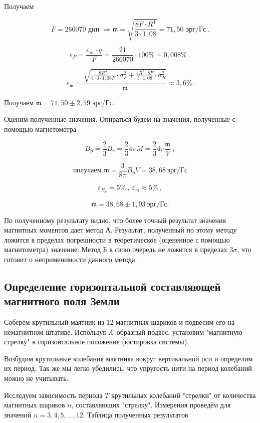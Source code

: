 \documentclass[a4paper, 12pt]{article}%
\begin{document}
Получаем 

\[F = 266070\text{ дин } \Rightarrow \mathfrak{m} = \sqrt{\frac{8F\cdot R^4}{3 \cdot 1,08}} =71,50 \text{ эрг/Гс} \ .\]

\[ \varepsilon_F = \frac{\varepsilon_m \cdot g}{F} = \frac{21}{266070} \cdot 100\% = 0,008\%\text{ ,}\]

\[ \varepsilon_{\mathfrak{m}} = \frac{\sqrt{\frac{8R^4}{4\cdot3\cdot1,08F}\cdot \sigma^2_{F} + \frac{4R^2\cdot 8F}{3\cdot 1,08}\cdot \sigma^2_{R}}}{\mathfrak{m}} \approx  3,6\%.\]

Получаем $\mathfrak{m} = 71,50 \pm 2,59$ эрг/Гс.

Оценим полученные значения. Опираться будем на значения, полученные с помощью магнетометра 

\[ B_p = \frac{2}{3} B_r = \frac{2}{3} 4\pi M = \frac{2}{3} 4\pi \frac{\mathfrak{m}}{V}\ , \]

\[ \text{получаем } \mathfrak{m} = \frac{3}{8\pi} B_p V = 38,68\ \text{эрг/Гс}\]

\[ \varepsilon_{B_p} = 5 \%\ ,\ \varepsilon_{\mathfrak{m}} \approx 5\% \ ,\]

\[ \mathfrak{m} = 38,68 \pm 1,93\ \text{эрг/Гс}.\]

По полученному результату видно, что более точный результат значения магнитных моментов дает метод А. Результат, полученный по этому методу ложится в пределах погрешности в теоретическое (оцененное с помощью магнитометра) значение. Метод Б в свою очередь не ложится в пределах $3\sigma$, что готовит о неприменимости данного метода.


\subsection{Определение горизонтальной составляющей магнитного поля Земли}

Соберём крутильный маятник из 12 магнитных шариков и подвесим его на немагнитном штативе. Используя $\Lambda$--образный подвес, установим "магнитную стрелку" в горизонтальное положение (юстировка системы).

Возбудим крутильные колебания маятника вокруг вертикальной оси и определим их период. Так же мы легко убедились, что упругость нити на период колебаний можно не учитывать. 

Исследуем зависимость периода $T$ крутильных колебаний "стрелки" от количества магнитных шариков $n$, составляющих "стрелку". Измерения проведём для значений $n = 3, 4, 5, \dots , 12$. Таблица полученных результатов 
\end{document}
